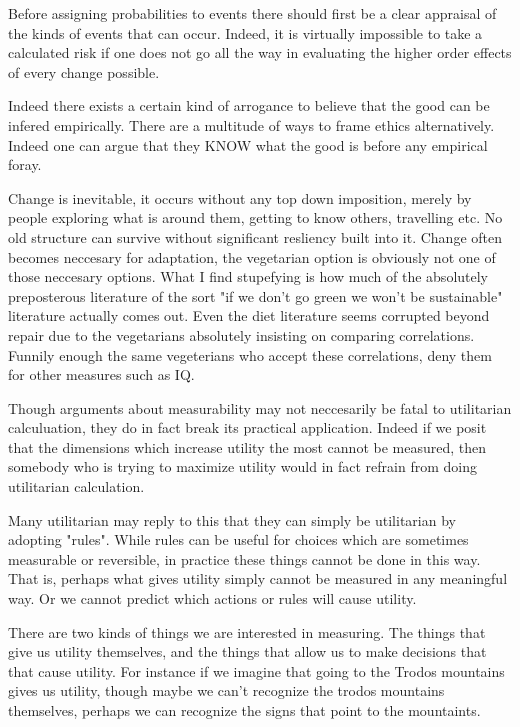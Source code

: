 Before assigning probabilities to events there should first be a clear appraisal of the kinds of events that can occur. Indeed, it is virtually impossible to take a calculated risk if one does not go all the way in evaluating the higher order effects of every change possible. 

Indeed there exists a certain kind of arrogance to believe that the good can be infered empirically. There are a multitude of ways to frame ethics alternatively. Indeed one can argue that they KNOW what the good is before any empirical foray. 

Change is inevitable, it occurs without any top down imposition, merely by people exploring what is around them, getting to know others, travelling etc. No old structure can survive without significant resliency built into it. Change often becomes neccesary for adaptation, the vegetarian option is obviously not one of those neccesary options. What I find stupefying is how much of the absolutely preposterous literature of the sort "if we don't go green we won't be sustainable"  literature actually comes out. Even the diet literature seems corrupted beyond repair due to the vegetarians absolutely insisting on comparing correlations. Funnily enough the same vegeterians who accept these correlations, deny them for other measures such as IQ. 

Though arguments about measurability may not neccesarily be fatal to utilitarian calculuation, they do in fact break its practical application. Indeed if we posit that the dimensions which increase utility the most cannot be measured, then somebody who is trying to maximize utility would in fact refrain from doing utilitarian calculation. 

Many utilitarian may reply to this that they can simply be utilitarian by adopting "rules". While rules can be useful for choices which are sometimes measurable or reversible, in practice these things cannot be done in this way. That is, perhaps what gives utility simply cannot be measured in any meaningful way. Or we cannot predict which actions or rules will cause utility. 


There are two kinds of things we are interested in measuring. The things that give us utility themselves, and the things that allow us to make decisions that that cause utility. For instance if we imagine that going to the Trodos mountains gives us utility, though maybe we can't recognize the trodos mountains themselves, perhaps we can recognize the signs that point to the mountaints. 


